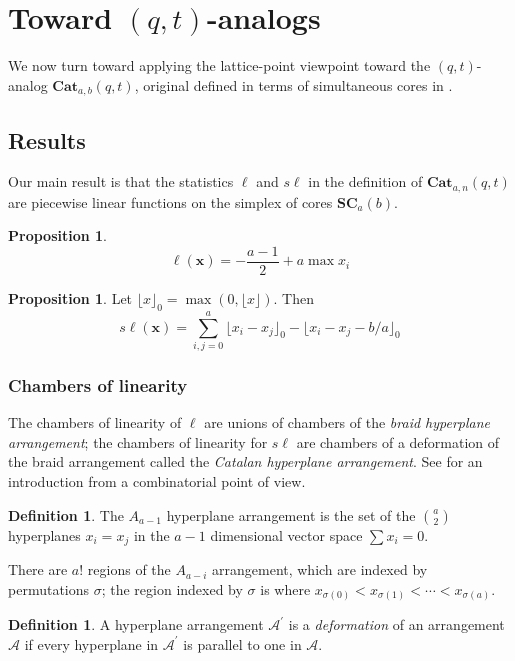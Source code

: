 \documentclass{amsart}[12pt]
\theoremstyle{definition}
\newtheorem{definition}[dummy]{Definition}
\newtheorem{proposition}[dummy]{Proposition}
\newcommand{\SC}{\mathbf{SC}}
\newcommand{\Cat}{\mathbf{Cat}}
\newcommand{\sk}{s\ell}
\begin{document}
\section{Toward \texorpdfstring{$(q,t)$}{(q,t)}-analogs} \label{sec:qt}

We now turn toward applying the lattice-point viewpoint toward the $(q,t)$-analog $\Cat_{a,b}(q,t)$, original defined in terms of simultaneous cores in \cite{AHJ}.  


\subsection{Results}
Our main result is that the statistics $\ell$ and $\sk$ in the definition of $\Cat_{a,n}(q,t)$ are piecewise linear functions on the simplex of cores $\SC_a(b)$.  

\begin{proposition}
\label{prop:length}
$$\ell(\mathbf{x})=-\frac{a-1}{2}+a\max x_i$$
\end{proposition}

\begin{proposition}
\label{prop:skewlength}
Let $\lfloor x\rfloor_0=\max\left(0, \lfloor x\rfloor\right)$.
Then
$$\sk(\mathbf{x})=\sum_{i,j=0}^a \lfloor x_i-x_j\rfloor_0 - \lfloor x_i-x_j-b/a\rfloor_0$$
\end{proposition}


\subsubsection{Chambers of linearity}

The chambers of linearity of $\ell$ are unions of chambers of the \emph{braid hyperplane arrangement}; the chambers of linearity for $\sk$ are chambers of a deformation of the braid arrangement called the  \emph{Catalan hyperplane arrangement}.  See \cite{StanleyHyperplane} for an introduction from a combinatorial point of view.


\begin{definition}
The $A_{a-1}$ hyperplane arrangement is the set of the $\binom{a}{2}$ hyperplanes $x_i=x_j$ in the $a-1$ dimensional vector space $\sum x_i=0$.

There are $a!$ regions of the $A_{a-i}$ arrangement, which are indexed by permutations $\sigma$; the region indexed by $\sigma$ is where $x_{\sigma(0)}<x_{\sigma(1)}<\cdots<x_{\sigma(a)}$.
\end{definition}

\begin{definition}
A hyperplane arrangement $\mathcal{A}^\prime$ is a \emph{deformation} of an arrangement $\mathcal{A}$ if every hyperplane in $\mathcal{A}^\prime$ is parallel to one in $\mathcal{A}$.
\end{definition}
\end{document}
